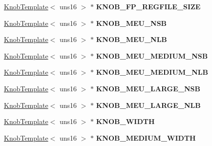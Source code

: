 \begin{DoxyCompactItemize}
\item 
\hypertarget{classall__knobs__c_a10b7b498ac993667a27c417fc7bd35a9}{
\hyperlink{classKnobTemplate}{KnobTemplate}$<$ uns16 $>$ $\ast$ {\bfseries KNOB\_\-FP\_\-REGFILE\_\-SIZE}}
\label{classall__knobs__c_a10b7b498ac993667a27c417fc7bd35a9}

\item 
\hypertarget{classall__knobs__c_a6ac7bb37dd70fff5080a0d0b5ec6dbb3}{
\hyperlink{classKnobTemplate}{KnobTemplate}$<$ uns16 $>$ $\ast$ {\bfseries KNOB\_\-MEU\_\-NSB}}
\label{classall__knobs__c_a6ac7bb37dd70fff5080a0d0b5ec6dbb3}

\item 
\hypertarget{classall__knobs__c_af7be1dfdbc88e19bbff45afaa3c1501a}{
\hyperlink{classKnobTemplate}{KnobTemplate}$<$ uns16 $>$ $\ast$ {\bfseries KNOB\_\-MEU\_\-NLB}}
\label{classall__knobs__c_af7be1dfdbc88e19bbff45afaa3c1501a}

\item 
\hypertarget{classall__knobs__c_af7d70bdfa1b06c656e93757d20aa356c}{
\hyperlink{classKnobTemplate}{KnobTemplate}$<$ uns16 $>$ $\ast$ {\bfseries KNOB\_\-MEU\_\-MEDIUM\_\-NSB}}
\label{classall__knobs__c_af7d70bdfa1b06c656e93757d20aa356c}

\item 
\hypertarget{classall__knobs__c_a03567d9504d4cde8b585afe5b2814410}{
\hyperlink{classKnobTemplate}{KnobTemplate}$<$ uns16 $>$ $\ast$ {\bfseries KNOB\_\-MEU\_\-MEDIUM\_\-NLB}}
\label{classall__knobs__c_a03567d9504d4cde8b585afe5b2814410}

\item 
\hypertarget{classall__knobs__c_a7ba927486d8125c44c4e37d9437ca2b3}{
\hyperlink{classKnobTemplate}{KnobTemplate}$<$ uns16 $>$ $\ast$ {\bfseries KNOB\_\-MEU\_\-LARGE\_\-NSB}}
\label{classall__knobs__c_a7ba927486d8125c44c4e37d9437ca2b3}

\item 
\hypertarget{classall__knobs__c_a6f515d805cb01ae73160b890245b9019}{
\hyperlink{classKnobTemplate}{KnobTemplate}$<$ uns16 $>$ $\ast$ {\bfseries KNOB\_\-MEU\_\-LARGE\_\-NLB}}
\label{classall__knobs__c_a6f515d805cb01ae73160b890245b9019}

\item 
\hypertarget{classall__knobs__c_acb9a88b5a87d929d48ed0066f63f810b}{
\hyperlink{classKnobTemplate}{KnobTemplate}$<$ uns16 $>$ $\ast$ {\bfseries KNOB\_\-WIDTH}}
\label{classall__knobs__c_acb9a88b5a87d929d48ed0066f63f810b}

\item 
\hypertarget{classall__knobs__c_a78b0bd532ebf98729cff646432beb545}{
\hyperlink{classKnobTemplate}{KnobTemplate}$<$ uns16 $>$ $\ast$ {\bfseries KNOB\_\-MEDIUM\_\-WIDTH}}
\label{classall__knobs__c_a78b0bd532ebf98729cff646432beb545}


\end{DoxyCompactItemize}
